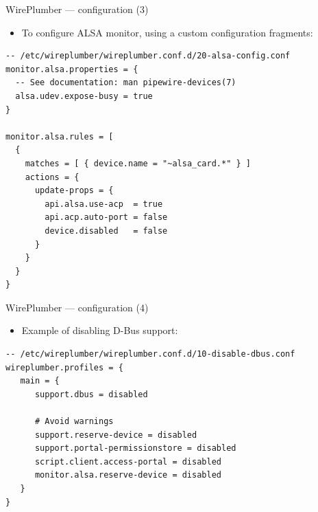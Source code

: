 \begin{frame}[fragile]{WirePlumber — configuration (3)}
  \begin{itemize}
  \item To configure ALSA monitor, using a custom configuration fragments:
  \end{itemize}

    \begin{block}{}
      \fontsize{10}{10}\selectfont
        \begin{verbatim}
-- /etc/wireplumber/wireplumber.conf.d/20-alsa-config.conf
monitor.alsa.properties = {
  -- See documentation: man pipewire-devices(7)
  alsa.udev.expose-busy = true
}

monitor.alsa.rules = [
  {
    matches = [ { device.name = "~alsa_card.*" } ]
    actions = {
      update-props = {
        api.alsa.use-acp  = true
        api.acp.auto-port = false
        device.disabled   = false
      }
    }
  }
}
          \end{verbatim}
        \end{block}
\end{frame}



\begin{frame}[fragile]{WirePlumber — configuration (4)}
  \begin{itemize}
  \item Example of disabling D-Bus support:
  \end{itemize}

    \begin{block}{}
      \fontsize{10}{10}\selectfont
        \begin{verbatim}
-- /etc/wireplumber/wireplumber.conf.d/10-disable-dbus.conf
wireplumber.profiles = {
   main = {
      support.dbus = disabled

      # Avoid warnings
      support.reserve-device = disabled
      support.portal-permissionstore = disabled
      script.client.access-portal = disabled
      monitor.alsa.reserve-device = disabled
   }
}
          \end{verbatim}
        \end{block}
\end{frame}



